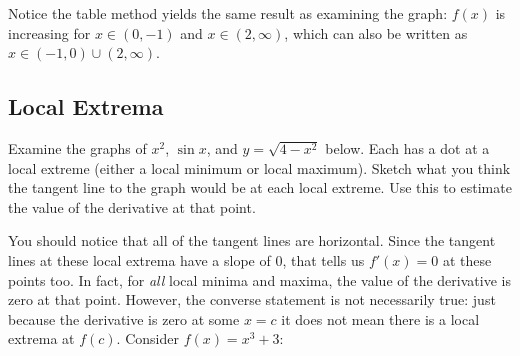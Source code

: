 Notice the table method yields the same result as examining the graph: $f(x)$ is increasing for $x\in (0, -1)$ and $x \in (2, \infty)$, which can also be written as $x \in (-1, 0) \cup (2, \infty)$. 

\subsection{Local Extrema}
Examine the graphs of $x^2$, $\sin{x}$, and $y=\sqrt{4-x^2}$ below. Each has a dot at a local extreme (either a local minimum or local maximum). Sketch what you think the tangent line to the graph would be at each local extreme. Use this to estimate the value of the derivative at that point. 




You should notice that all of the tangent lines are horizontal. Since the tangent lines at these local extrema have a slope of $0$, that tells us $f'(x)=0$ at these points too. In fact, for \textit{all} local minima and maxima, the value of the derivative is zero at that point. However, the converse statement is not necessarily true: just because the derivative is zero at some $x=c$ it does not mean there is a local extrema at $f(c)$. Consider $f(x) = x^3+3$:


